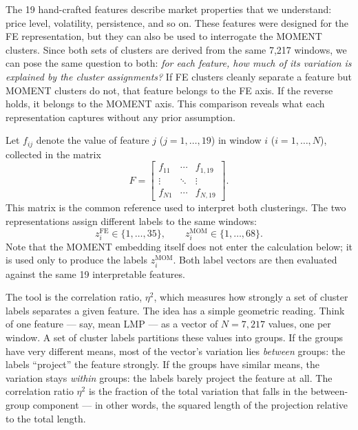\documentclass[12pt]{article}
\begin{document}
The 19 hand-crafted features describe market properties that we understand: price level, volatility, persistence, and so on.
These features were designed for the FE representation, but they can also be used to interrogate the MOMENT clusters.
Since both sets of clusters are derived from the same 7,217 windows, we can pose the same question to both: \emph{for each feature, how much of its variation is explained by the cluster assignments?}
If FE clusters cleanly separate a feature but MOMENT clusters do not, that feature belongs to the FE axis.
If the reverse holds, it belongs to the MOMENT axis.
This comparison reveals what each representation captures without any prior assumption.

Let $f_{ij}$ denote the value of feature $j$ ($j=1,\ldots,19$) in window $i$ ($i=1,\ldots,N$), collected in the matrix
\begin{equation}
F =
\begin{bmatrix}
f_{11} & \cdots & f_{1,19} \\
\vdots & \ddots & \vdots \\
f_{N1} & \cdots & f_{N,19}
\end{bmatrix}.
\label{eq:feature_matrix}
\end{equation}
This matrix is the common reference used to interpret both clusterings.
The two representations assign different labels to the same windows:
\begin{equation}
z_i^\text{FE} \in \{1,\ldots,35\},
\qquad
z_i^\text{MOM} \in \{1,\ldots,68\}.
\label{eq:pre_merge_labels}
\end{equation}
Note that the MOMENT embedding itself does not enter the calculation below; it is used only to produce the labels $z_i^\text{MOM}$.
Both label vectors are then evaluated against the same 19 interpretable features.

The tool is the correlation ratio, $\eta^2$, which measures how strongly a set of cluster labels separates a given feature.
The idea has a simple geometric reading.
Think of one feature --- say, mean LMP --- as a vector of $N = 7{,}217$ values, one per window.
A set of cluster labels partitions these values into groups.
If the groups have very different means, most of the vector's variation lies \emph{between} groups: the labels ``project'' the feature strongly.
If the groups have similar means, the variation stays \emph{within} groups: the labels barely project the feature at all.
The correlation ratio $\eta^2$ is the fraction of the total variation that falls in the between-group component --- in other words, the squared length of the projection relative to the total length.
\end{document}
